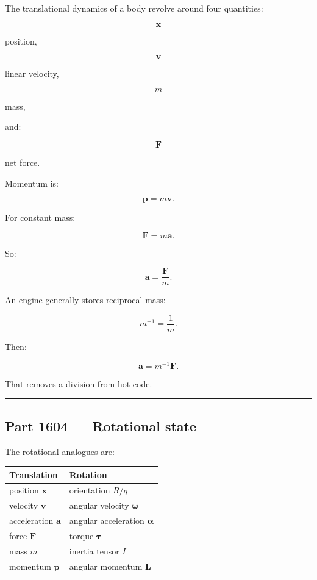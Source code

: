The translational dynamics of a body revolve around four quantities:

\[
\mathbf{x}
\]

position,

\[
\mathbf{v}
\]

linear velocity,

\[
m
\]

mass,

and:

\[
\mathbf{F}
\]

net force.

Momentum is:

\[
\mathbf{p}=m\mathbf{v}.
\]

For constant mass:

\[
\mathbf{F}=m\mathbf{a}.
\]

So:

\[
\mathbf{a}
=
\frac{\mathbf{F}}{m}.
\]

An engine generally stores reciprocal mass:

\[
m^{-1}
=
\frac{1}{m}.
\]

Then:

\[
\mathbf{a}
=
m^{-1}\mathbf{F}.
\]

That removes a division from hot code.

\begin{center}\rule{0.5\linewidth}{0.5pt}\end{center}

\subsection{Part 1604 --- Rotational state}\label{06-engine-ii-ch034-part-1604-rotational-state}

The rotational analogues are:

{\def\LTcaptype{none} %
\begin{longtable}[]{@{}
  >{\raggedright\arraybackslash}p{}
  >{\raggedright\arraybackslash}p{}@{}}
\toprule\noalign{}
\begin{minipage}[b]{\linewidth}\raggedright
Translation
\end{minipage} & \begin{minipage}[b]{\linewidth}\raggedright
Rotation
\end{minipage} \\
\midrule\noalign{}
\endhead
\bottomrule\noalign{}
\endlastfoot
position \(\mathbf{x}\) & orientation \(R/q\) \\
velocity \(\mathbf{v}\) & angular velocity \(\boldsymbol{\omega}\) \\
acceleration \(\mathbf{a}\) & angular acceleration \(\boldsymbol{\alpha}\) \\
force \(\mathbf{F}\) & torque \(\boldsymbol{\tau}\) \\
mass \(m\) & inertia tensor \(I\) \\
momentum \(\mathbf{p}\) & angular momentum \(\mathbf{L}\) \\
\end{longtable}
}

